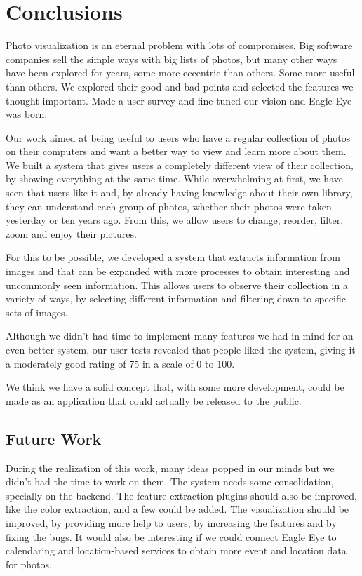 \section{Conclusions}
\label{chapter:conclusions}



Photo visualization is an eternal problem with lots of compromises. Big software companies sell the simple ways with big lists of photos, but many other ways have been explored for years, some more eccentric than others. Some more useful than others. We explored their good and bad points and selected the features we thought important. Made a user survey and fine tuned our vision and Eagle Eye was born.

Our work aimed at being useful to users who have a regular collection of photos on their computers and want a better way to view and learn more about them. We built a system that gives users a completely different view of their collection, by showing everything at the same time. While overwhelming at first, we have seen that users like it and, by already having knowledge about their own library, they can understand each group of photos, whether their photos were taken yesterday or ten years ago. From this, we allow users to change, reorder, filter, zoom and enjoy their pictures.

For this to be possible, we developed a system that extracts information from images and that can be expanded with more processes to obtain interesting and uncommonly seen information. This allows  users to observe their collection in a variety of ways, by selecting different information and filtering down to specific sets of images.


Although we didn't had time to implement many features we had in mind for an even better system, our user tests revealed that people liked the system, giving it a moderately good rating of 75 in a scale of 0 to 100. 

We think we have a solid concept that, with some more development, could be made as an application that could actually be released to the public.






\subsection{Future Work} %
\label{future_work}

During the realization of this work, many ideas popped in our minds but we didn't had the time to work on them. The system needs some consolidation, specially on the backend. The feature extraction plugins should also be improved, like the color extraction, and a few could be added. The visualization should be improved, by providing more help to users, by increasing the features and by fixing the bugs. It would also be interesting if we could connect Eagle Eye to calendaring and location-based services to obtain more event and location data for photos.